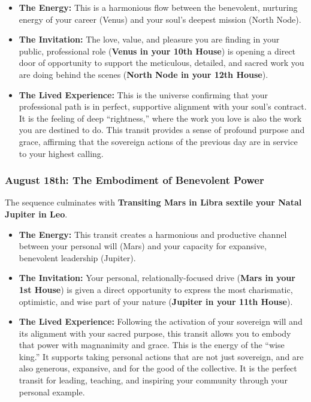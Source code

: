 \documentclass{article}
\begin{document}
\begin{itemize}
\item
  \textbf{The Energy:} This is a harmonious flow between the benevolent, nurturing energy of your career (Venus) and your soul's deepest mission (North Node).
\item
  \textbf{The Invitation:} The love, value, and pleasure you are finding in your public, professional role (\textbf{Venus in your 10th House}) is opening a direct door of opportunity to support the meticulous, detailed, and sacred work you are doing behind the scenes (\textbf{North Node in your 12th House}).
\item
  \textbf{The Lived Experience:} This is the universe confirming that your professional path is in perfect, supportive alignment with your soul's contract. It is the feeling of deep ``rightness,'' where the work you love is also the work you are destined to do. This transit provides a sense of profound purpose and grace, affirming that the sovereign actions of the previous day are in service to your highest calling.
\end{itemize}

\subsubsection*{August 18th: The Embodiment of Benevolent Power}\label{august-18th-the-embodiment-of-benevolent-power}

The sequence culminates with \textbf{Transiting Mars in Libra sextile your Natal Jupiter in Leo}.

\begin{itemize}
\item
  \textbf{The Energy:} This transit creates a harmonious and productive channel between your personal will (Mars) and your capacity for expansive, benevolent leadership (Jupiter).
\item
  \textbf{The Invitation:} Your personal, relationally-focused drive (\textbf{Mars in your 1st House}) is given a direct opportunity to express the most charismatic, optimistic, and wise part of your nature (\textbf{Jupiter in your 11th House}).
\item
  \textbf{The Lived Experience:} Following the activation of your sovereign will and its alignment with your sacred purpose, this transit allows you to embody that power with magnanimity and grace. This is the energy of the ``wise king.'' It supports taking personal actions that are not just sovereign, and are also generous, expansive, and for the good of the collective. It is the perfect transit for leading, teaching, and inspiring your community through your personal example.
\end{itemize}
\end{document}
